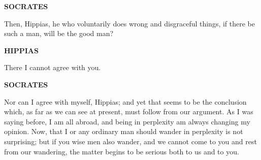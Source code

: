 \documentclass[11pt,letter]{article}
\begin{document}
\par \textbf{SOCRATES}
\par   Then, Hippias, he who voluntarily does wrong and disgraceful things, if there be such a man, will be the good man?

\par \textbf{HIPPIAS}
\par   There I cannot agree with you.

\par \textbf{SOCRATES}
\par   Nor can I agree with myself, Hippias; and yet that seems to be the conclusion which, as far as we can see at present, must follow from our argument. As I was saying before, I am all abroad, and being in perplexity am always changing my opinion. Now, that I or any ordinary man should wander in perplexity is not surprising; but if you wise men also wander, and we cannot come to you and rest from our wandering, the matter begins to be serious both to us and to you.

\par 
 
\end{document}

